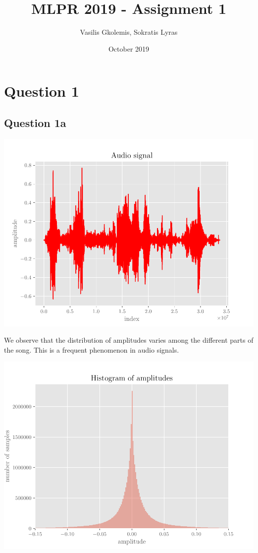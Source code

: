 \documentclass{article}
\title{MLPR 2019 - Assignment 1}
\author{Vasilis Gkolemis, Sokratis Lyras}
\date{October 2019}
\begin{document}
\maketitle

\section{Question 1}
\subsection{Question 1a}

\includegraphics[scale=0.75]{fig_01.pdf}

We observe that the distribution of amplitudes varies among the different parts of the song. This is a frequent phenomenon in audio signals.

\includegraphics[scale=0.75]{fig_02.pdf}
\end{document}
